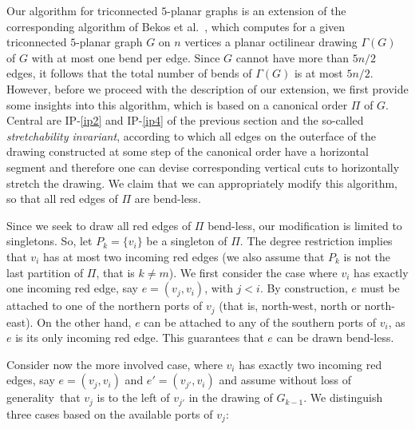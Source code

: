 \documentclass[a4paper,twoside,11pt]{article}
\begin{document}
Our algorithm for triconnected $5$-planar graphs is an extension of
the corresponding algorithm of Bekos et al.~\cite{BGKK14}, which
computes for a given triconnected $5$-planar graph $G$ on $n$
vertices a planar octilinear drawing $\Gamma(G)$ of $G$ with at most
one bend per edge. Since $G$ cannot have more than $5n/2$ edges, it
follows that the total number of bends of $\Gamma(G)$ is at most
$5n/2$. However, before we proceed with the description of our
extension, we first provide some insights into this algorithm, which
is based on a canonical order $\Pi$ of $G$.
Central are IP-\ref{ip2} and IP-\ref{ip4} of the previous section and
the so-called \emph{stretchability invariant}, according to which all
edges on the outerface of the drawing constructed at some step of the
canonical order have a horizontal segment and therefore one can
devise corresponding vertical cuts to horizontally stretch the
drawing. We claim that we can appropriately modify this algorithm, so
that all red edges of $\Pi$ are bend-less.

Since we seek to draw all red edges of $\Pi$ bend-less, our
modification is limited to singletons. So, let $P_k = \{ v_i \}$ be
a singleton of $\Pi$. The degree restriction implies that $v_i$ has
at most two incoming red edges (we also assume that $P_k$ is not the
last partition of $\Pi$, that is $k \neq m$). We first consider the
case where $v_i$ has exactly one incoming red edge, say
$e=(v_j,v_i)$, with $j<i$. By construction, $e$ must be attached to
one of the northern ports of $v_j$ (that is, north-west, north or
north-east). On the other hand, $e$ can be attached to any of
the southern ports of $v_i$, as $e$ is its only incoming red edge.
This guarantees that $e$ can be drawn bend-less.

Consider now the more involved case, where $v_i$ has exactly two
incoming red edges, say $e=(v_j,v_i)$ and $e' = (v_{j'},v_i)$ and
assume without loss of generality~that $v_j$ is to the left of
$v_{j'}$ in the drawing of $G_{k-1}$. We distinguish three cases
based on the available ports of $v_j$:
\end{document}
